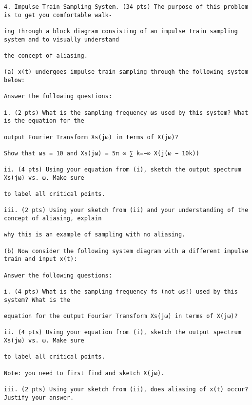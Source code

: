 \documentclass[11pt,addpoints]{exam}
\begin{document}
\begin{center}
\end{center}




\begin{verbatim}
4. Impulse Train Sampling System. (34 pts) The purpose of this problem is to get you comfortable walk-

ing through a block diagram consisting of an impulse train sampling system and to visually understand

the concept of aliasing.

(a) x(t) undergoes impulse train sampling through the following system below:

Answer the following questions:

i. (2 pts) What is the sampling frequency ωs used by this system? What is the equation for the

output Fourier Transform Xs(jω) in terms of X(jω)?

Show that ωs = 10 and Xs(jω) = 5π ∞ ∑ k=−∞ X(j(ω − 10k))

ii. (4 pts) Using your equation from (i), sketch the output spectrum Xs(jω) vs. ω. Make sure

to label all critical points.

iii. (2 pts) Using your sketch from (ii) and your understanding of the concept of aliasing, explain

why this is an example of sampling with no aliasing.

(b) Now consider the following system diagram with a different impulse train and input x(t):

Answer the following questions:

i. (4 pts) What is the sampling frequency fs (not ωs!) used by this system? What is the

equation for the output Fourier Transform Xs(jω) in terms of X(jω)?

ii. (4 pts) Using your equation from (i), sketch the output spectrum Xs(jω) vs. ω. Make sure

to label all critical points.

Note: you need to first find and sketch X(jω).

iii. (2 pts) Using your sketch from (ii), does aliasing of x(t) occur? Justify your answer.


\end{verbatim}
\end{document}
